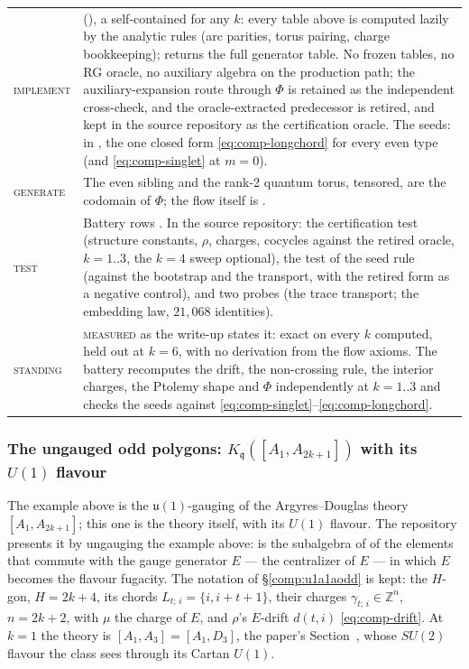 \documentclass[11pt]{amsart}
\makeatletter
\newcommand\fq{\mathfrak{q}}
\newcommand\bZ{\mathbb{Z}}
\theoremstyle{remark}
\newcommand{\pref}[1]{\@ifundefined{r@P-#1}{\textup{[\texttt{\detokenize{#1}}]}}{\ref{P-#1}}}
\newcommand{\MEASURED}{\textsc{measured}}
\newenvironment{machinery}{%
  \leavevmode\par\medskip\noindent
  \begin{tabular}{@{}>{\scshape}p{2.1cm}>{\raggedright\arraybackslash}p{\dimexpr\linewidth-2.5cm\relax}@{}}\toprule}%
  {\bottomrule\end{tabular}\par\medskip}
\makeatother
\begin{document}
\begin{machinery}
implement & \code{U1A1AoddKAlg(k)} (\file{src/cone/u1a1aodd_kalg.py}), a self-contained \code{ConeKAlgebra} for any $k$: every table above is computed lazily by the analytic rules (arc parities, torus pairing, charge bookkeeping); \code{base_table_predict_odd(k)} returns the full generator table.  No frozen tables, no RG oracle, no auxiliary algebra on the production path; the auxiliary-expansion route through $\Phi$ is retained as the independent cross-check, and the oracle-extracted predecessor is retired, and kept in the source repository as the certification oracle.  The seeds: \code{singlet_chord_trace} in \file{src/cone/u1_pgon_layer2.py}, the one closed form \eqref{eq:comp-longchord} for every even type (and \eqref{eq:comp-singlet} at $m=0$). \\
generate & The even sibling \code{A1A2kKAlg(k)} and the rank-2 quantum torus, tensored, are the codomain of $\Phi$; the flow itself is \file{src/rg/u1a1aodd_gauged_rg.py}. \\
test & Battery rows \code{comp:u1a1aodd/*}.  In the source repository: the certification test (structure constants, $\rho$, charges, cocycles against the retired oracle, $k=1..3$, the $k=4$ sweep optional), the test of the seed rule (against the bootstrap and the transport, with the retired form as a negative control), and two probes (the trace transport; the embedding law, $21{,}068$ identities). \\
standing & \MEASURED{} as the write-up states it: exact on every $k$ computed, held out at $k=6$, with no derivation from the flow axioms.  The battery recomputes the drift, the non-crossing rule, the interior charges, the Ptolemy shape and $\Phi$ independently at $k=1..3$ and checks the seeds against \eqref{eq:comp-singlet}--\eqref{eq:comp-longchord}. \\
\end{machinery}

\subsubsection{The ungauged odd polygons: $K_\fq([A_1,A_{2k+1}])$ with its $U(1)$ flavour}\label{comp:a1aodd}
The example above is the $\mathfrak u(1)$-gauging of the Argyres--Douglas
theory $[A_1,A_{2k+1}]$; this one is the theory itself, with its $U(1)$
flavour.  The repository presents it by ungauging the example above:
 is the subalgebra of  of the
elements that commute with the gauge generator $E$ --- the centralizer of
$E$ --- in which $E$ becomes the flavour fugacity.  The notation of
\S\ref{comp:u1a1aodd} is kept: the $H$-gon, $H=2k+4$, its chords
$L_{t;\,i}=\{i,i+t+1\}$, their charges $\gamma_{t;\,i}\in\bZ^n$, $n=2k+2$, with
$\mu$ the charge of $E$, and $\rho$'s $E$-drift $d(t,i)$
\eqref{eq:comp-drift}.  At $k=1$ the theory is $[A_1,A_3]=[A_1,D_3]$, the
paper's Section~\pref{sec:a1d3}, whose $SU(2)$ flavour the class sees through
its Cartan $U(1)$.
\end{document}
